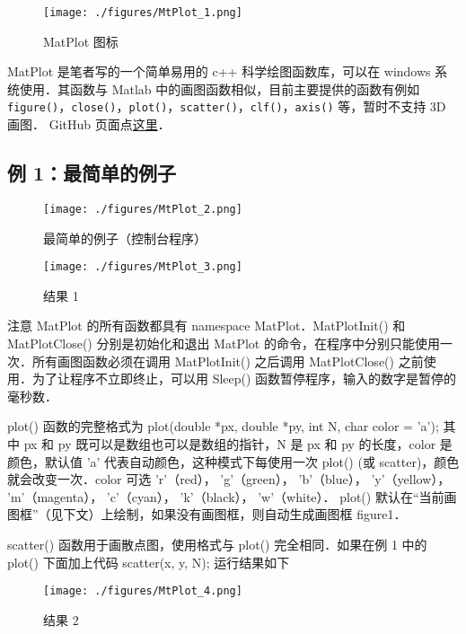 
\begin{figure}[ht]
\centering
\texttt{[image: ./figures/MtPlot\_1.png]}
\caption{MatPlot 图标} \label{MtPlot_fig1}
\end{figure}

MatPlot 是笔者写的一个简单易用的 c++ 科学绘图函数库，可以在 windows 系统使用．其函数与 Matlab 中的画图函数相似，目前主要提供的函数有例如 \verb|figure()|，\verb|close()|，\verb|plot()|，\verb|scatter()|，\verb|clf()|，\verb|axis()| 等，暂时不支持 3D 画图． GitHub 页面点\href{https://github.com/MacroUniverse/MatPlot}{这里}．


\subsection{例 1：最简单的例子}

\begin{figure}[ht]
\centering
\texttt{[image: ./figures/MtPlot\_2.png]}
\caption{最简单的例子（控制台程序）} \label{MtPlot_fig2}
\end{figure}

\begin{figure}[ht]
\centering
\texttt{[image: ./figures/MtPlot\_3.png]}
\caption{结果 1} \label{MtPlot_fig3}
\end{figure}

注意 MatPlot 的所有函数都具有 namespace MatPlot．MatPlotInit() 和 MatPlotClose() 分别是初始化和退出 MatPlot 的命令，在程序中分别只能使用一次．所有画图函数必须在调用 MatPlotInit() 之后调用 MatPlotClose() 之前使用．为了让程序不立即终止，可以用 Sleep() 函数暂停程序，输入的数字是暂停的毫秒数．

plot() 函数的完整格式为
plot(double *px, double *py, int N, char color = 'a');
其中 px 和 py 既可以是数组也可以是数组的指针，N 是 px 和 py 的长度，color 是颜色，默认值 'a' 代表自动颜色，这种模式下每使用一次 plot() (或 scatter)，颜色就会改变一次．color 可选 'r'（red）， 'g'（green）， 'b'（blue）， 'y'（yellow）， 'm'（magenta）， 'c'（cyan）， 'k'（black）， 'w'（white）． plot() 默认在“当前画图框”（见下文）上绘制，如果没有画图框，则自动生成画图框 figure1．

scatter() 函数用于画散点图，使用格式与 plot() 完全相同．如果在例 1 中的 plot() 下面加上代码
scatter(x, y, N);
运行结果如下

\begin{figure}[ht]
\centering
\texttt{[image: ./figures/MtPlot\_4.png]}
\caption{结果 2} \label{MtPlot_fig4}
\end{figure}

